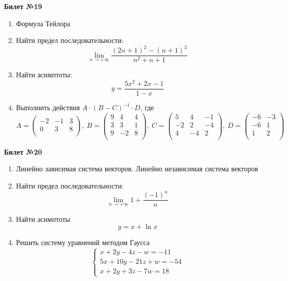 \documentclass[a4paper, 12pt]{article}
\begin{document}
\newpage
\begin{center}
    \textbf{Билет №19}
\end{center}
\begin{enumerate}
\item Формула Тейлора
\item Найти предел последовательности:  
\[\lim \limits_{n \to +\infty} \frac{(2n + 1)^2 - (n + 1)^2}{n^2 + n + 1}\]
\item Найти асимптоты:
\[y = \frac{5x^2 + 2x -1}{1 - x}\]
\item Выполнить действия \(A \cdot (B - C)^{-1}\cdot D\), где
\[
		A = \begin{pmatrix}
			-2 & -1 & 3 \\
			0 & 3 & 8 \\
		\end{pmatrix}, \ 
		B = \begin{pmatrix}
			9 & 4 & 4 \\
			3 & 3 & 1 \\
			9 & -2 & 8 \\
		\end{pmatrix}, \ 
		C = \begin{pmatrix}
			5 & 4 & -1 \\
			-2 & 2 & -4 \\
			4 & -4 & 2 \\
		\end{pmatrix}, \ 
		D = \begin{pmatrix}
			-6 & -3 \\
			-6 & 1 \\
			1 & 2 \\
		\end{pmatrix}
	\]
\end{enumerate}

\begin{center}
    \textbf{Билет №20}
\end{center}
\begin{enumerate}
\item Линейно зависимая система векторов. Линейно независимая система векторов
\item Найти предел последовательности:  
\[\lim \limits_{n \to +\infty} 1 + \frac{(-1)^n}{n}\]
\item Найти асимптоты
\[y = x + \ln x\]
\item Решить систему уравнений методом Гаусса
\[
	\begin{cases}
		x + 2y - 4z - w = -11 \\
		5x + 10y - 21z + w = -54 \\
		x + 2y + 3z - 7w = 18
	\end{cases}
\]
\end{enumerate}
\end{document}
